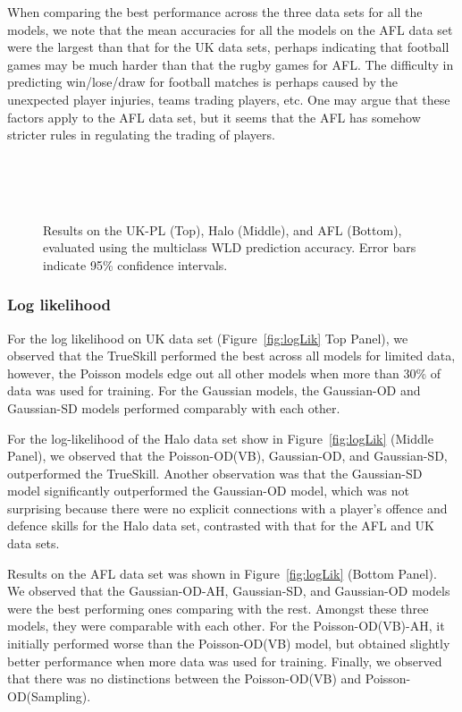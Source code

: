 When comparing the best performance across the three data sets for all the models, we note that the mean accuracies for all the models on the AFL data set were the largest than that for the UK data sets, perhaps indicating that football games may be much harder than that the rugby games for AFL. The difficulty in predicting win/lose/draw for football matches is perhaps caused by the unexpected player injuries, teams trading players, etc. One may argue that these factors apply to the AFL data set, but it seems that the AFL has somehow stricter rules in regulating the trading of players. 

\begin{center}
\begin{figure}[htbp!]
 \centering
 \\
\\
\\
\caption{\small Results on the UK-PL (Top), Halo (Middle), and AFL (Bottom), evaluated
using the multiclass WLD prediction accuracy. Error bars indicate
95\% confidence intervals.}
\label{fig:accuracyWLD}
\end{figure}
\end{center}

\subsubsection{Log likelihood}
For the log likelihood on UK data set (Figure~\ref{fig:logLik} Top Panel), we observed that the TrueSkill performed the best across all models for limited data, however, the Poisson models edge out all other models when more than 30\% of data was used for training. For the Gaussian models, the Gaussian-OD and Gaussian-SD models performed comparably with each other. 

For the log-likelihood of the Halo data set show in Figure~\ref{fig:logLik} (Middle Panel), we observed that the Poisson-OD(VB), Gaussian-OD, and Gaussian-SD, outperformed the TrueSkill. Another observation was that the Gaussian-SD model significantly outperformed the Gaussian-OD model, which was not surprising because there were no explicit connections with a player's offence and defence skills for the Halo data set, contrasted with that for the AFL and UK data sets. 

Results on the AFL data set was shown in Figure~\ref{fig:logLik} (Bottom Panel). We observed that the Gaussian-OD-AH, Gaussian-SD, and Gaussian-OD models were the best performing ones comparing with the rest. Amongst these three models, they were comparable with each other. For the Poisson-OD(VB)-AH, it initially performed worse than the Poisson-OD(VB) model, but obtained slightly better performance when more data was used for training. Finally, we observed that there was no distinctions between the Poisson-OD(VB) and Poisson-OD(Sampling). 

